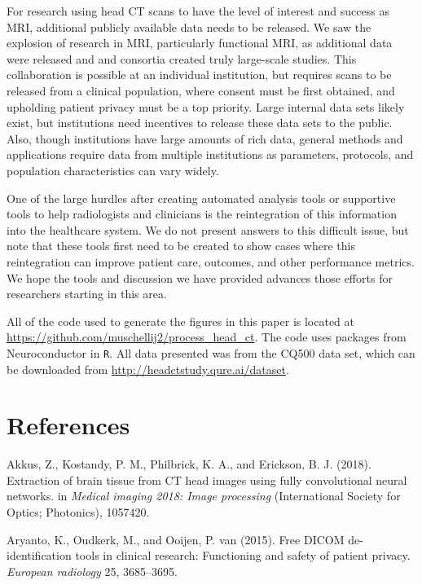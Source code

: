 \documentclass[utf8]{frontiersSCNS}
\begin{document}
For research using head CT scans to have the level of interest and success as MRI, additional publicly available data needs to be released. We saw the explosion of research in MRI, particularly functional MRI, as additional data were released and and consortia created truly large-scale studies. This collaboration is possible at an individual institution, but requires scans to be released from a clinical population, where consent must be first obtained, and upholding patient privacy must be a top priority. Large internal data sets likely exist, but institutions need incentives to release these data sets to the public. Also, though institutions have large amounts of rich data, general methods and applications require data from multiple institutions as parameters, protocols, and population characteristics can vary widely.

One of the large hurdles after creating automated analysis tools or supportive tools to help radiologists and clinicians is the reintegration of this information into the healthcare system. We do not present answers to this difficult issue, but note that these tools first need to be created to show cases where this reintegration can improve patient care, outcomes, and other performance metrics. We hope the tools and discussion we have provided advances those efforts for researchers starting in this area.

All of the code used to generate the figures in this paper is located at \url{https://github.com/muschellij2/process_head_ct}. The code uses packages from Neuroconductor in \texttt{R}. All data presented was from the CQ500 data set, which can be downloaded from \url{http://headctstudy.qure.ai/dataset}.

\hypertarget{references}{%
\section*{References}\label{references}}

\hypertarget{refs}{}
\leavevmode\hypertarget{ref-ct_bet}{}%
Akkus, Z., Kostandy, P. M., Philbrick, K. A., and Erickson, B. J. (2018). Extraction of brain tissue from CT head images using fully convolutional neural networks. in \emph{Medical imaging 2018: Image processing} (International Society for Optics; Photonics), 1057420.

\leavevmode\hypertarget{ref-aryanto2015free}{}%
Aryanto, K., Oudkerk, M., and Ooijen, P. van (2015). Free DICOM de-identification tools in clinical research: Functioning and safety of patient privacy. \emph{European radiology} 25, 3685--3695.
\end{document}
